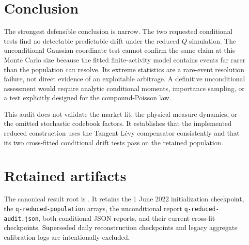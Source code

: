 \documentclass[11pt]{article}
\begin{document}
\section{Conclusion}

The strongest defensible conclusion is narrow.  The two requested conditional
tests find no detectable predictable drift under the reduced $Q$ simulation.
The unconditional Gaussian coordinate test cannot confirm the same claim at
this Monte Carlo size because the fitted finite-activity model contains events
far rarer than the population can resolve.  Its extreme statistics are a
rare-event resolution failure, not direct evidence of an exploitable
arbitrage.  A definitive unconditional assessment would require analytic
conditional moments, importance sampling, or a test explicitly designed for
the compound-Poisson law.

This audit does not validate the market fit, the physical-measure dynamics, or
the omitted stochastic codebook factors.  It establishes that the implemented
reduced construction uses the Tangent L\'evy compensator consistently and that
its two cross-fitted conditional drift tests pass on the retained population.

\section{Retained artifacts}

The canonical result root is
.
It retains the 1 June 2022 initialization checkpoint, the
\texttt{q-reduced-population} arrays, the unconditional report
\texttt{q-reduced-audit.json}, both conditional JSON reports, and their current
cross-fit checkpoints.  Superseded daily reconstruction checkpoints and legacy
aggregate calibration logs are intentionally excluded.
\end{document}
